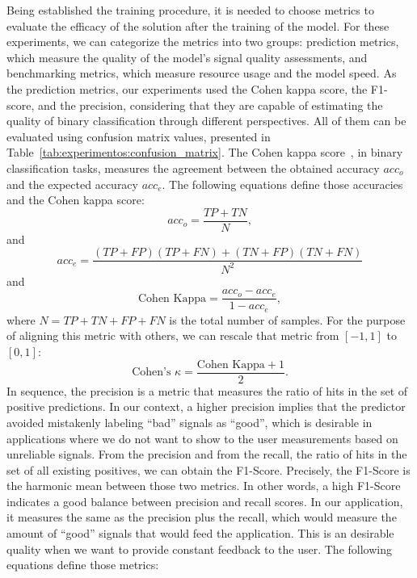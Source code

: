 \documentclass[final,3p,times,twocolumn]{elsarticle}
\begin{document}
Being established the training procedure, it is needed to choose metrics to evaluate the efficacy of the solution after the training of the model. For these experiments, we can categorize the metrics into two groups: prediction metrics, which measure the quality of the model's signal quality assessments, and benchmarking metrics, which measure resource usage and the model speed. As the prediction metrics, our experiments used the Cohen kappa score, the F1-score, and the precision, considering that they are capable of estimating the quality of binary classification through different perspectives. All of them can be evaluated using confusion matrix values, presented in Table~\ref{tab:experimentos:confusion_matrix}. The Cohen kappa score~\cite{CohenKappa}, in binary classification tasks, measures the agreement between the obtained accuracy $acc_o$ and the expected accuracy $acc_e$. The following equations define those accuracies and the Cohen kappa score:
\begin{equation}
acc_o = \frac{TP+TN}{N},
\end{equation}
and 
\begin{equation}
    acc_{e} = \frac{ (TP+FP)(TP+FN) + (TN+FP)(TN+FN) }{N^2} 
\end{equation}
and
\begin{equation} \label{eq:Cohen kappa}
\text{Cohen Kappa}  = \frac{acc_o - acc_e}{1 - acc_e}, 
\end{equation}  
where $N=TP+TN+FP+FN$ is the total number of samples. For the purpose of aligning this metric with others, we can rescale that metric from $[-1,1]$ to $[0,1]$:
\begin{equation}
 \text{Cohen's~} \kappa = \frac{\text{Cohen Kappa} +1}{2}.
\end{equation}  
In sequence, the precision is a metric that measures the ratio of hits in the set of positive predictions. In our context, a higher precision implies that the predictor avoided mistakenly labeling ``bad'' signals as ``good'', which is desirable in applications where we do not want to show to the user measurements based on unreliable signals. From the precision and from the recall, the ratio of hits in the set of all existing positives, we can obtain the F1-Score. Precisely, the F1-Score is the harmonic mean between those two metrics. In other words, a high F1-Score indicates a good balance between precision and recall scores. In our application, it measures the same as the precision plus the recall, which would measure the amount of ``good'' signals that would feed the application. This is an desirable quality when we want to provide constant feedback to the user. The following equations define those metrics:
\end{document}
